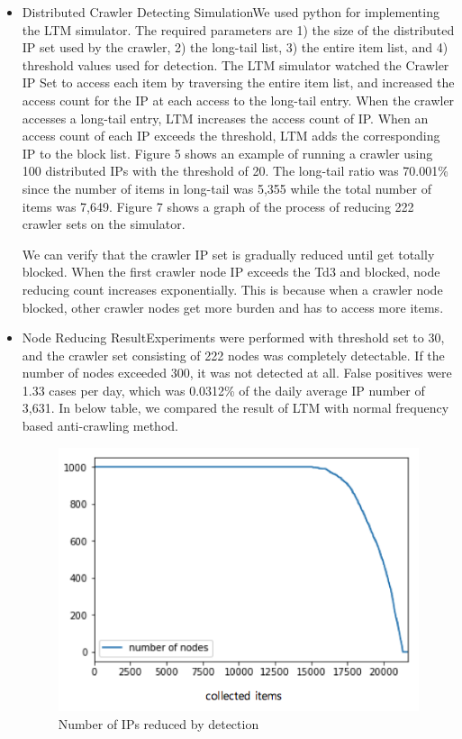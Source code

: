 \documentclass[sigconf,anonymous=true]{acmart}
\begin{document}
\begin{itemize}
\item Distributed Crawler Detecting Simulation\newline We used python for implementing the LTM simulator. The required parameters are 1) the size of the distributed IP set used by the crawler, 2) the long-tail list, 3) the entire item list, and 4) threshold values used for detection.
The LTM simulator watched the Crawler IP Set to access each item by traversing the entire item list, and increased the access count for the IP at each access to the long-tail entry.
When the crawler accesses a long-tail entry, LTM increases the access count of IP. When an access count of each IP exceeds the threshold, LTM adds the corresponding IP to the block list. Figure 5 shows an example of running a crawler using 100 distributed IPs with the threshold of 20. The long-tail ratio was 70.001\% since the number of items in long-tail was 5,355 while the total number of items was 7,649. Figure 7 shows a graph of the process of reducing 222 crawler sets on the simulator. 

We can verify that the crawler IP set is gradually reduced until get totally blocked. When the first crawler node IP exceeds the Td3 and blocked, node reducing count increases exponentially. This is because when a crawler node blocked, other crawler nodes get more burden and has to access more items.\newline

\item Node Reducing Result\newline Experiments were performed with threshold set to 30, and the crawler set consisting of 222 nodes was completely detectable. If the number of nodes exceeded 300, it was not detected at all. False positives were 1.33 cases per day, which was 0.0312\% of the daily average IP number of 3,631. In below table, we compared the result of LTM with normal frequency based anti-crawling method.

\begin{figure}[H]
    \centering
    \includegraphics[width=0.7\columnwidth]{figs/figure_06_nr.png}
    \caption{Number of IPs reduced by detection}
    \label{fig:fig7}
\end{figure}


\end{itemize}
\end{document}
